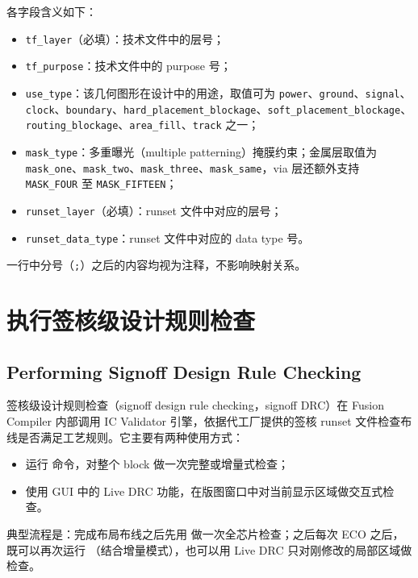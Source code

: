 各字段含义如下：
\begin{itemize}
  \item \texttt{tf\_layer}（必填）：技术文件中的层号；
  \item \texttt{tf\_purpose}：技术文件中的 purpose 号；
  \item \texttt{use\_type}：该几何图形在设计中的用途，取值可为 \texttt{power}、\texttt{ground}、\texttt{signal}、\texttt{clock}、\texttt{boundary}、\texttt{hard\_placement\_blockage}、\texttt{soft\_placement\_blockage}、\texttt{routing\_blockage}、\texttt{area\_fill}、\texttt{track} 之一；
  \item \texttt{mask\_type}：多重曝光（multiple patterning）掩膜约束；金属层取值为 \texttt{mask\_one}、\texttt{mask\_two}、\texttt{mask\_three}、\texttt{mask\_same}，via 层还额外支持 \texttt{MASK\_FOUR} 至 \texttt{MASK\_FIFTEEN}；
  \item \texttt{runset\_layer}（必填）：runset 文件中对应的层号；
  \item \texttt{runset\_data\_type}：runset 文件中对应的 data type 号。
\end{itemize}

一行中分号（\texttt{;}）之后的内容均视为注释，不影响映射关系。

\section{执行签核级设计规则检查}
\subsection*{Performing Signoff Design Rule Checking}

签核级设计规则检查（signoff design rule checking，signoff DRC）在 Fusion Compiler 内部调用 IC Validator 引擎，依据代工厂提供的签核 runset 文件检查布线是否满足工艺规则。它主要有两种使用方式：
\begin{itemize}
  \item 运行  命令，对整个 block 做一次完整或增量式检查；
  \item 使用 GUI 中的 Live DRC 功能，在版图窗口中对当前显示区域做交互式检查。
\end{itemize}

典型流程是：完成布局布线之后先用  做一次全芯片检查；之后每次 ECO 之后，既可以再次运行 （结合增量模式），也可以用 Live DRC 只对刚修改的局部区域做检查。

